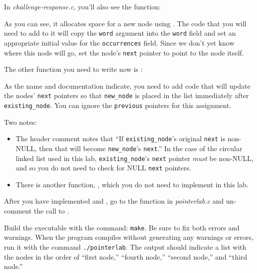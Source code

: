 In \textit{challenge-response.c}, you'll also see the  function:



As you can see, it allocates space for a new node using .
The code that you will need to add to it will copy the \lstinline{word} argument into the \lstinline{word} field and set an appropriate initial value for the \lstinline{occurrences} field.
Since we don't yet know where this node will go, set the node's \lstinline{next} pointer to point to the node itself.

The other function you need to write now is :



As the name and documentation indicate, you need to add code that will update the nodes' \lstinline{next} pointers so that \lstinline{new_node} is placed in the list immediately after \lstinline{existing_node}.
You can ignore the \lstinline{previous} pointers for this assignment.

Two notes:
\begin{itemize}
    \item The header comment notes that ``If \lstinline{existing_node}'s original \lstinline{next} is non-NULL, then that will become \lstinline{new_node}'s \lstinline{next}.''
            In the case of the circular linked list used in this lab, \lstinline{existing_node}'s \lstinline{next} pointer \textit{must} be non-NULL, and so you do not need to check for NULL \lstinline{next} pointers.
    \item There is another function, , which you do not need to implement in this lab.
\end{itemize}

After you have implemented  and , go to the  function in \textit{pointerlab.c} and un-comment the call to .



Build the executable with the command: \texttt{make}.
Be sure to fix both errors and warnings.
When the program compiles without generating any warnings or errors, run it with the command \texttt{./pointerlab}.
The output should indicate a list with the nodes in the order of ``first node,'' ``fourth node,'' ``second node,'' and ``third node.''

